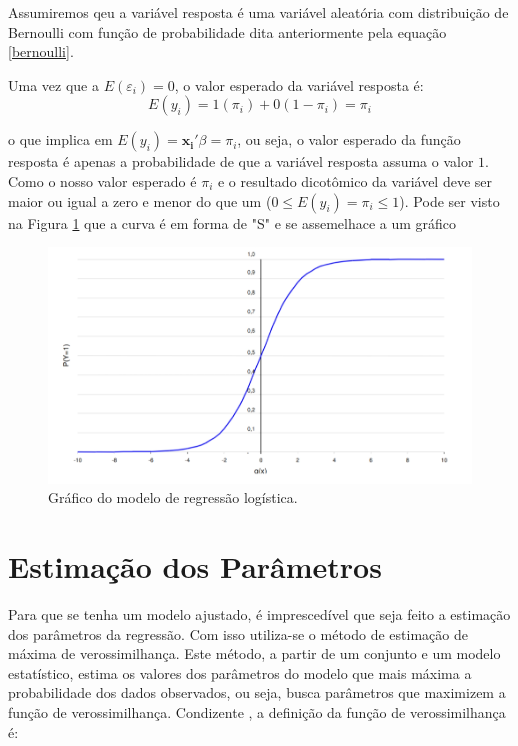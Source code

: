 \documentclass[
	12pt,				%
	openright,			%
	oneside,      %
	a4paper,			%
	english,			%
	french,				%
	spanish,			%
	brazil,				%
	]{abntex2}\usepackage[]{graphicx}\usepackage[table]{xcolor}
\theoremstyle{definition}
\begin{document}
Assumiremos qeu a variável resposta é uma variável aleatória 
com distribuição de Bernoulli com função de probabilidade dita anteriormente pela 
equação \ref{bernoulli}.

Uma vez que a $E(\varepsilon_i) = 0$, o valor esperado da variável resposta é:
\begin{equation}
  E(y_i) = 1(\pi_i) + 0(1 - \pi_i)= \pi_i
\end{equation}

\noindent o que implica em $E(y_i) = \mathbf{x_i'}\beta = \pi_i$, ou seja, o valor esperado da função
resposta é apenas a probabilidade de que a variável resposta assuma o valor $1$. Como o nosso valor esperado é $\pi_i$ e o resultado dicotômico da variável deve ser maior ou igual a zero e menor do que um ($0 \leq E(y_i) = \pi_i \leq 1$). Pode ser visto na Figura \ref{img2} que a curva é em forma de "S" e se assemelhace a um gráfico 





    \begin{figure}
      \caption{\label{img2}Gráfico do modelo de regressão logística.}
      \begin{center}
        \includegraphics[scale = 0.6]{image/img2.png}
      \end{center}
    \end{figure}


    \section{Estimação dos Parâmetros}
    
Para que se tenha um modelo ajustado, é imprescedível que seja feito a estimação dos parâmetros da regressão. Com isso utiliza-se o método de estimação de máxima de verossimilhança. Este método, a partir de um conjunto e um modelo estatístico, estima os valores dos parâmetros do modelo que mais máxima a probabilidade dos dados observados, ou seja, busca parâmetros que maximizem a função de verossimilhança. Condizente \cite{bolfarine2010introduccao}, a definição da função de verossimilhança é:
\end{document}
